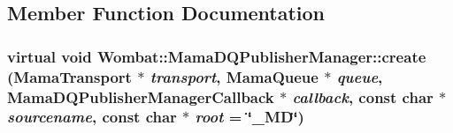 \subsection{Member Function Documentation}
\hypertarget{classWombat_1_1MamaDQPublisherManager_ac25a92885d801ba9fdc8bc72c443ab8d}{
\subsubsection[{create}]{\setlength{\rightskip}{0pt plus 5cm}virtual void Wombat::MamaDQPublisherManager::create ({\bf MamaTransport} $\ast$ {\em transport}, \/  {\bf MamaQueue} $\ast$ {\em queue}, \/  {\bf MamaDQPublisherManagerCallback} $\ast$ {\em callback}, \/  const char $\ast$ {\em sourcename}, \/  const char $\ast$ {\em root} = {\ttfamily \char`\"{}\_\-MD\char`\"{}})}}
\label{classWombat_1_1MamaDQPublisherManager_ac25a92885d801ba9fdc8bc72c443ab8d}


